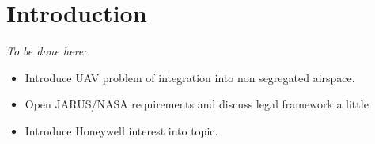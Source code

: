\cleardoublepage
\chapter{Introduction}\label{ch:introduction}
    \emph{To be done here:}
    \begin{itemize}
        \item Introduce UAV problem of integration into non segregated airspace.
        \item Open JARUS/NASA requirements and discuss legal framework a little
        \item Introduce Honeywell interest into topic.
    \end{itemize}